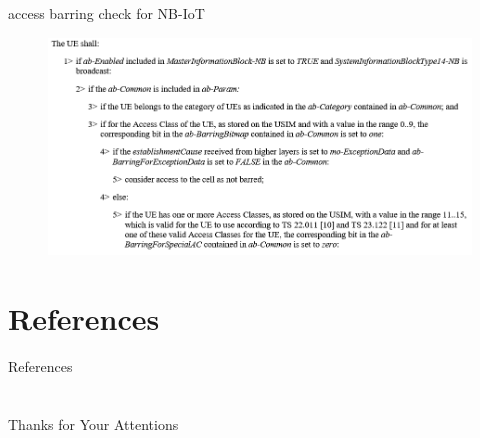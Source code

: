\documentclass{beamer}
\begin{document}
\begin{frame} {access barring check for NB-IoT \cite{spec}}  
    \begin{figure}[t]
    \centering
    \includegraphics[width=1\textwidth]{figures/ab.png}
    \end{figure}
\end{frame}



\section{References}
\calcreferencespagetotal %
\begin{frame}[allowframebreaks]{References}
    \fontsize{9pt}{13}\selectfont
    
    
\end{frame}

\section{}

\begin{frame}
    \centering
    \Large{Thanks for Your Attentions}
\end{frame}
\end{document}
